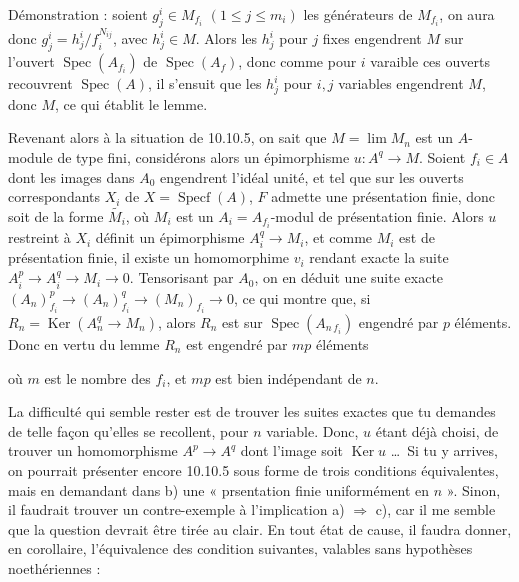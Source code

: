 \documentclass[11pt,a4paper]{article}
\begin{document}
Démonstration : soient $g^i_j \in M_{f_i}$ $(1 \leq j \leq m_i)$ les
générateurs de $M_{f_i}$, on aura donc $g^i_j = h^i_j / f_i^{N_{ij}}$, avec
$h^i_j \in M$. Alors les $h^i_j$ pour $j$ fixes engendrent $M$ sur l'ouvert
$\operatorname{Spec}(A_{f_i})$ de $\operatorname{Spec}(A_f)$, donc comme pour
$i$ varaible ces ouverts recouvrent $\operatorname{Spec}(A)$, il s'ensuit que
les $h^i_j$ pour $i,j$ variables engendrent $M$, donc $M$, ce qui établit le
lemme.

Revenant alors à la situation de 10.10.5, on sait que $M = \lim M_n$ est un
$A$-module de type fini, considérons alors un épimorphisme
$u : A^q \to M$. Soient $f_i \in A$ dont les images dans $A_0$ engendrent
l'idéal unité, et tel que sur les ouverts correspondants $X_i$ de
$X = \operatorname{Specf}(A)$, $F$ admette une présentation finie, donc soit
de la forme $\widetilde{M_i}$, où $M_i$ est un $A_i = A_{f_i}$-modul de
présentation finie. Alors $u$ restreint à $X_i$ définit un épimorphisme
$A_i^q \to M_i$, et comme $M_i$ est de présentation finie, il existe un
homomorphime $v_i$ rendant exacte la suite $A_i^p \to A_i^q \to M_i \to 0$.
Tensorisant par $A_0$,
on en déduit une suite exacte
$(A_n)_{f_i}^p \to (A_n)_{f_i}^q \to (M_n)_{f_i} \to 0$, ce qui montre que,
si $R_n = \operatorname{Ker}(A_n^q \to M_n)$, alors $R_n$ est sur
$\operatorname{Spec}(A_{n\, f_i})$ engendré par $p$ éléments. Donc en vertu
du lemme $R_n$ est engendré par $mp$ éléments



où $m$ est le nombre des $f_i$, et $mp$ est bien indépendant de $n$.

La difficulté qui semble rester est de trouver les suites exactes que tu
demandes de telle façon qu'elles se recollent, pour $n$ variable. Donc, $u$
étant déjà choisi, de trouver un homomorphisme $A^p \to A^q$ dont l'image soit
$\operatorname{Ker} u$ \ldots\ Si tu y arrives, on pourrait présenter encore
10.10.5 sous forme de trois conditions équivalentes, mais en demandant dans
b) une « prsentation finie uniformément en $n$ ». Sinon, il faudrait trouver
un contre-exemple à l'implication a) $\Rightarrow$ c), car il me semble que
la question devrait être tirée au clair. En tout état de cause, il faudra
donner, en corollaire, l'équivalence des condition suivantes, valables sans
hypothèses noethériennes :
\end{document}
